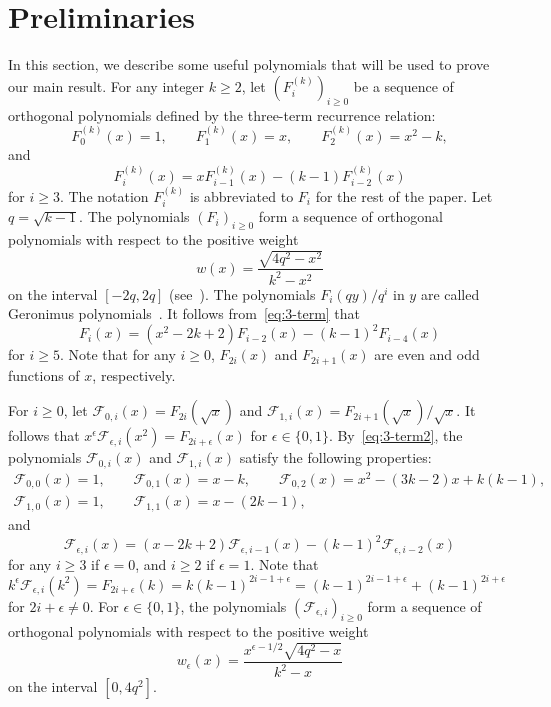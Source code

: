 \section{Preliminaries} \label{sec:pre}
In this section, we describe some useful polynomials that will be used to prove our main result. For any integer $k\geq 2$, let $(F_i^{(k)})_{i\geq 0}$ be a sequence of orthogonal polynomials defined by the three-term recurrence relation: 
\begin{equation*}
F_0^{(k)}(x)=1, \qquad F_1^{(k)}(x)=x, \qquad F_2^{(k)}(x)=x^2 - k, 
\end{equation*}
and
\begin{equation} \label{eq:3-term}
F_i^{(k)}(x)=x F_{i-1}^{(k)}(x)- (k-1) F_{i-2}^{(k)}(x)
\end{equation}
for $i\geq 3$. 
The notation $F_i^{(k)}$ is abbreviated to $F_i$ for the rest of the paper. Let $q=\sqrt{k-1}$. The polynomials $(F_i)_{i\geq 0}$ form a sequence of orthogonal polynomials 
with respect to the positive weight
\[
w(x)=\frac{\sqrt{4q^2-x^2}}{k^2-x^2}
\]
on the interval $[-2q, 2q]$ 
(see~\cite[Section~4]{HOb}). 
The polynomials $F_i(q y)/ q^i$ in $y$ are called Geronimus
polynomials~\cite{G30,H15}. 
It follows from~\eqref{eq:3-term} that 
\begin{equation} \label{eq:3-term2}
F_i(x)=(x^2-2k+2) F_{i-2}(x)- (k-1)^2 F_{i-4}(x)
\end{equation}
for $i\geq 5$. Note that for any $i\geq 0$, $F_{2i}(x)$ and $F_{2i+1}(x)$ are 
even and odd functions of $x$, respectively.

For $i\geq 0$, let $\mathscr{F}_{0,i}(x)=F_{2i}(\sqrt{x})$ and $\mathscr{F}_{1,i}(x)=F_{2i+1}(\sqrt{x})/\sqrt{x}$. 
It follows that $x^{\epsilon} \mathscr{F}_{\epsilon,i}(x^2)=F_{2i+\epsilon}(x)$ for $\epsilon\in \{0,1\}$. 
By~\eqref{eq:3-term2}, the polynomials $\mathscr{F}_{0,i}(x)$ and $\mathscr{F}_{1,i}(x)$ satisfy the following properties:
\begin{gather*}
\mathscr{F}_{0,0}(x)=1, \qquad 
\mathscr{F}_{0,1}(x)=x-k, \qquad
\mathscr{F}_{0,2}(x)=x^2-(3k-2)x+k(k-1), 
\\
\mathscr{F}_{1,0}(x)=1, \qquad 
\mathscr{F}_{1,1}(x)=x-(2k-1),
\end{gather*}
and 
\begin{equation} \label{eq:new_3-term}
\mathscr{F}_{\epsilon, i}(x)=(x-2k+2) \mathscr{F}_{\epsilon,i-1}(x)-(k-1)^2 \mathscr{F}_{\epsilon, i-2}(x)
\end{equation}
for any $i\geq 3$ if $\epsilon=0$, and $i\geq 2$ if $\epsilon=1$. 
Note that $k^{\epsilon} \mathscr{F}_{\epsilon,i}(k^2)=F_{2i+\epsilon}(k)=k(k-1)^{2i-1+\epsilon}=(k-1)^{2i-1+\epsilon}+(k-1)^{2i+\epsilon}$ for $2i+\epsilon \ne 0$. 
For $\epsilon\in \{0,1\}$, the polynomials $(\mathscr{F}_{\epsilon,i})_{i\geq 0}$ form a sequence of orthogonal polynomials with respect to the positive weight 
\[
w_\epsilon(x)=\frac{x^{\epsilon-1/2} \sqrt{4q^2-x}}{k^2-x}
\]
on the interval $[0, 4q^2]$. 

